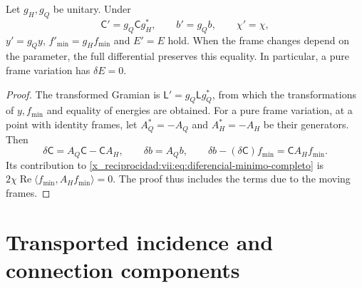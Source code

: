 \begin{proposition}
\label{x_reciprocidad:vii:prop:covariancia-minimo}
Let \(g_H,g_Q\) be unitary. Under
\[
 \mathsf C'=g_Q\mathsf C g_H^*,\qquad b'=g_Qb,\qquad \chi'=\chi,
\]
\(y'=g_Qy\), \(f'_{\min}=g_Hf_{\min}\) and \(E'=E\) hold. When the frame changes depend on the parameter, the full differential preserves this equality. In particular, a pure frame variation has \(\delta E=0\).
\end{proposition}

\begin{proof}
The transformed Gramian is \(\mathsf L'=g_Q\mathsf Lg_Q^*\), from which the transformations of \(y,f_{\min}\) and equality of energies are obtained. For a pure frame variation, at a point with identity frames, let \(A_Q^*=-A_Q\) and \(A_H^*=-A_H\) be their generators. Then
\[
 \delta\mathsf C=A_Q\mathsf C-\mathsf C A_H,\qquad
 \delta b=A_Qb,\qquad
 \delta b-(\delta\mathsf C)f_{\min}=\mathsf C A_Hf_{\min}.
\]
Its contribution to \eqref{x_reciprocidad:vii:eq:diferencial-minimo-completo} is \(2\chi\operatorname{Re}\langle f_{\min},A_Hf_{\min}\rangle=0\). The proof thus includes the terms due to the moving frames.
\end{proof}

\section{Transported incidence and connection components}
\label{x_reciprocidad:vii:subsec:incidencia-conexion-minima}

